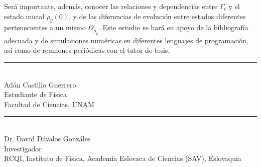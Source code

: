 \documentclass[onecolumn,11pt]{article}
\begin{document}
Será importante, además, conocer las relaciones y dependencias entre $\Gamma_{t}$ y el estado inicial $\rho_{g}(0)$, y de las diferencias de evolución entre estados diferentes pertenecientes a un mismo $\Omega_{\rho_{g}}$. Este estudio se hará en apoyo de la bibliografía adecuada y de simulaciones numéricas en diferentes lenguajes de programación, así como de reuniones periódicas con el tutor de tesis.

\vspace{3.0cm}


\begin{center}
    \rule{200pt}{0.4pt}\\
    Adán Castillo Guerrero \\
    Estudiante de Física \\
    Facultad de Ciencias, UNAM \\
    
\end{center}

\vspace{1.0cm}

\begin{center}
    \rule{200pt}{0.4pt}\\
    Dr. David Dávalos Gonzáles \\
    Investigador \\
    RCQI, Instituto de Física, Academia Eslovaca de Ciencias (SAV), Eslovaquia\\
    
\end{center}


\end{document}

